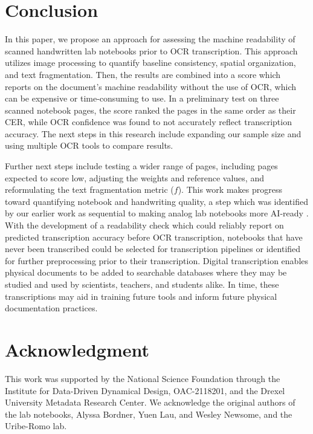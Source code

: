 \documentclass[conference]{IEEEtran}
\begin{document}

\section{Conclusion}
In this paper, we propose an approach for assessing the machine readability of
scanned handwritten lab notebooks prior to OCR transcription. This approach
utilizes image processing to quantify baseline consistency, spatial
organization, and text fragmentation. Then, the results are combined into a
score which reports on the document's machine readability without the use of
OCR, which can be expensive or time-consuming to use. In
a preliminary test on three scanned notebook pages, the score ranked the pages
in the same order as their CER, while OCR confidence was found to not
accurately reflect transcription accuracy. The next steps in this research
include expanding our sample size and using multiple OCR tools to compare
results.

Further next steps include testing a wider range of pages, including pages
expected to score low, adjusting the weights and reference values, and
reformulating the text fragmentation metric ($f$).
This work makes progress toward quantifying notebook and handwriting quality, a
step which was identified by our earlier work as sequential to making analog
lab notebooks more AI-ready \cite{pepper2025}. With the development of a
readability check which could reliably report on predicted transcription
accuracy before OCR transcription, notebooks that have never been transcribed
could be selected for transcription pipelines or identified for further
preprocessing prior to their transcription. Digital transcription enables
physical documents to be added to searchable databases where they may be
studied and used by scientists, teachers, and students alike. In time, these
transcriptions may aid in training future tools and inform future physical
documentation practices.


\section*{Acknowledgment}
This work was supported by the National Science Foundation through the
Institute for Data-Driven Dynamical Design, OAC-2118201, and the Drexel
University Metadata Research Center. We acknowledge the original authors of the
lab notebooks, Alyssa Bordner, Yuen Lau, and Wesley Newsome, and the
Uribe-Romo lab.
\end{document}
